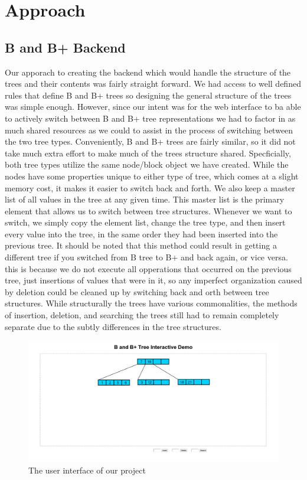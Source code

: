 \section{Approach}

\subsection{B and B+ Backend}
Our apporach to creating the backend which would handle the structure
of the trees and their contents was fairly straight forward.  We had
access to well defined rules that define B and B+ trees so designing
the general structure of the trees was simple enough.  However, since
our intent was for the web interface to ba able to actively switch
between B and B+ tree representations we had to factor in as much
shared resources as we could to assist in the process of switching
between the two tree types.  Conveniently, B and B+ trees are fairly
similar, so it did not take much extra effort to make much of the
trees structure shared.  Specficially, both tree types utilize the
same node/block object we have created.  While the nodes have some
properties unique to either type of tree, which comes at a slight
memory cost, it makes it easier to switch back and forth.  We also
keep a master list of all values in the tree at any given time.  This
master list is the primary element that allows us to switch between
tree structures.  Whenever we want to switch, we simply copy the
element list, change the tree type, and then insert every value into
the tree, in the same order they had been inserted into the previous
tree.  It should be noted that this method could result in getting a
different tree if you switched from B tree to B+ and back again, or
vice versa.  this is because we do not execute all opperations that
occurred on the previous tree, just insertions of values that were in
it, so any imperfect organization caused by deletion could be cleaned
up by switching back and orth between tree structures.  While
structurally the trees have various commonalities, the methods of
insertion, deletion, and searching the trees still had to remain
completely separate due to the subtly differences in the tree
structures.

\begin{figure}[htp]
\centering
\includegraphics[scale=0.25]{images/Interface.png}
\caption{The user interface of our project}
\label{UI}
\end{figure}
